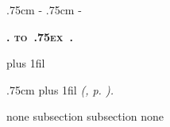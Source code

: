 \begingroup
\newcommand*{\DotsAndPage}
{\nobreak\leaders\hbox{\bfseries\normalsize\hbox to .75ex {\hss.\hss}}%
         \hfill\nobreak
         \makebox[\rightskip][r]{\bfseries\normalsize\etocpage}\par}

{\parindent 0pt
 \nobreak
 \etocskipfirstprefix}
{\pagebreak[3]\bigskip}
{\large\rmfamily\bfseries\scshape\centering
 \etocname\par}
{}

{\leftskip 0pt \rightskip .75cm \parfillskip-\rightskip
 \nobreak\medskip
 \etocskipfirstprefix}
{\leftskip 0pt \rightskip .75cm \parfillskip-\rightskip
 \pagebreak[1]\smallskip}
{\normalsize\rmfamily\bfseries\scshape
 \etocnumber. \etocname\DotsAndPage }
{\parfillskip 0pt plus 1fil\relax }

{\rightskip .75cm \parfillskip 0pt plus 1fil\relax
 \nobreak\smallskip}
{}
{\footnotesize\sffamily\mdseries\itshape
 \etocname{} (\etocnumber, p. \etocpage). }
{\par\medskip}

   {none}
 {subsection}
 {subsection}
     {none}

\etocsettocstyle {\centering\LARGE\textsc{\contentsname}\par\nobreak\medskip}{}
\tableofcontents
\endgroup
